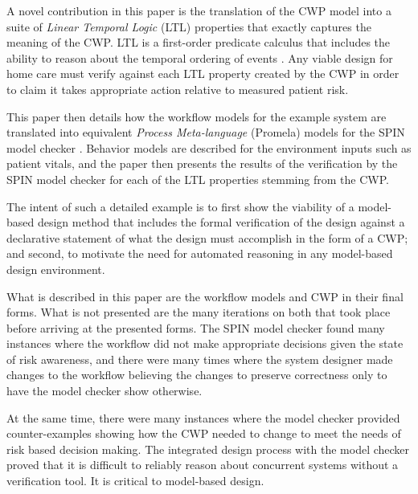 A novel contribution in this paper is the translation of the CWP model into a suite of \emph{Linear Temporal Logic} (LTL) properties that exactly captures the meaning of the CWP. LTL is a first-order predicate calculus that includes the ability to reason about the temporal ordering of events \cite{10.5555/975331}. Any viable design for home care must verify against each LTL property created by the CWP in order to claim it takes appropriate action relative to measured patient risk.

This paper then details how the workflow models for the example system are translated into equivalent \emph{Process Meta-language} (Promela) models for the SPIN model checker \cite{spin}. Behavior models are described for the environment inputs such as patient vitals, and the paper then presents the results of the verification by the SPIN model checker for each of the LTL properties stemming from the CWP. 

The intent of such a detailed example is to first show the viability of a model-based design method that includes the formal verification of the design against a declarative statement of what the design must accomplish in the form of a CWP; and second, to motivate the need for automated reasoning in any model-based design environment.  

What is described in this paper are the workflow models and CWP in their final forms. What is not presented are the many iterations on both that took place before arriving at the presented forms. The SPIN model checker found many instances where the workflow did not make appropriate decisions given the state of risk awareness, and there were many times where the system designer made changes to the workflow believing the changes to preserve correctness only to have the model checker show otherwise. 

At the same time, there were many instances where the model checker provided counter-examples showing how the CWP needed to change to meet the needs of risk based decision making. The integrated design process with the model checker proved that it is difficult to reliably reason about concurrent systems without a verification tool. It is critical to model-based design.